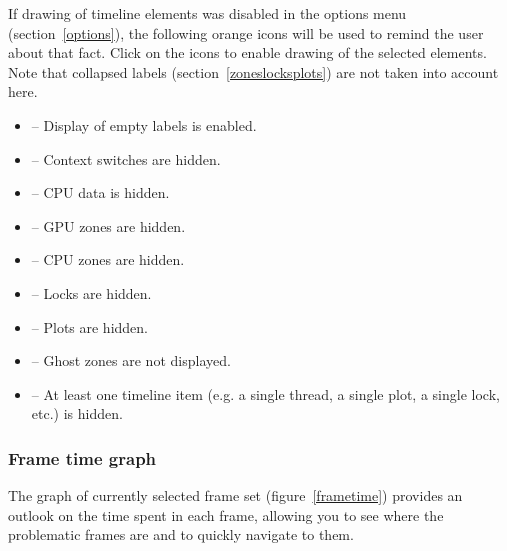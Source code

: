 \documentclass[hidelinks,titlepage,a4paper]{article}
\begin{document}
If drawing of timeline elements was disabled in the options menu (section~\ref{options}), the following orange icons will be used to remind the user about that fact. Click on the icons to enable drawing of the selected elements. Note that collapsed labels (section~\ref{zoneslocksplots}) are not taken into account here.

\begin{itemize}
\item \faExpand{} -- Display of empty labels is enabled.
\item \faHiking{} -- Context switches are hidden.
\item \faSlidersH{} -- CPU data is hidden.
\item \faEye{} -- GPU zones are hidden.
\item \faMicrochip{} -- CPU zones are hidden.
\item \faLock{} -- Locks are hidden.
\item \faSignature{} -- Plots are hidden.
\item \faGhost{} -- Ghost zones are not displayed.
\item \faLowVision{} -- At least one timeline item (e.g. a single thread, a single plot, a single lock, etc.) is hidden.
\end{itemize}

\subsubsection{Frame time graph}
\label{frametimegraph}

The graph of currently selected frame set (figure~\ref{frametime}) provides an outlook on the time spent in each frame, allowing you to see where the problematic frames are and to quickly navigate to them.
\end{document}
